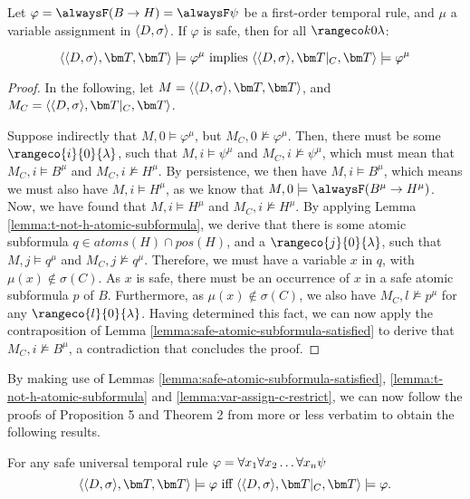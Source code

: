 \begin{lemma}\label{lemma:var-assign-c-restrict}
  Let $\varphi=\alwaysF (B \rightarrow H)=\alwaysF \psi$ be a
  first-order temporal rule, and $\mu$ a variable assignment in
  $\langle D, \sigma \rangle$. If $\varphi$ is safe, then for all $\kinlambda$:

$$
\qttandt \models \varphi^\mu \text{ implies } \qttcandt \models \varphi^\mu
$$
\end{lemma}
\begin{proof}
  In the following, let $M=\qttandt$, and $M_C=\qttcandt$.

  Suppose indirectly that $M,0 \models \varphi^\mu$, but
  $M_C,0 \not \models \varphi^\mu$. Then, there must be some
  $\rangeco{i}{0}{\lambda}$, such that $M,i \models \psi^\mu$ and
  $M_C,i \not \models \psi^\mu$, which must mean that
  $M_C,i \models B^\mu$ and $M_C,i \not \models H^\mu$. By
  persistence, we then have $M,i \models B^\mu$, which means we must
  also have $M,i \models H^\mu$, as we know that
  $M,0 \models \alwaysF(B^\mu \rightarrow H^\mu)$. Now, we have found
  that $M,i \models H^\mu$ and $M_C,i \not \models H^\mu$. By applying
  Lemma \ref{lemma:t-not-h-atomic-subformula}, we derive that there is
  some atomic subformula $q \in atoms(H) \cap pos(H)$, and a
  $\rangeco{j}{0}{\lambda}$, such that $M,j \models q^\mu$ and
  $M_C,j \not \models q^\mu$. Therefore, we must have a variable $x$
  in $q$, with $\mu(x) \not \in \sigma(C)$. As $x$ is safe, there must
  be an occurrence of $x$ in a safe atomic subformula $p$ of
  $B$. Furthermore, as $\mu(x) \not \in \sigma(C)$, we also have
  $M_C,l \not \models p^\mu$ for any $\rangeco{l}{0}{\lambda}$. Having
  determined this fact, we can now apply the contraposition of Lemma
  \ref{lemma:safe-atomic-subformula-satisfied} to derive that
  $M_C,i \not \models B^\mu$, a contradiction that concludes the
  proof.
\end{proof}

By making use of Lemmas \ref{lemma:safe-atomic-subformula-satisfied},
\ref{lemma:t-not-h-atomic-subformula} and
\ref{lemma:var-assign-c-restrict}, we can now follow the proofs of
Proposition 5 and Theorem 2 from \cite{agcapevidi17a} more or less
verbatim to obtain the following results.

\begin{proposition}
  For any safe universal temporal rule $\varphi = \forall x_1 \forall x_2 \dots \forall x_n \psi$
  \begin{equation*} \qttandt \models \varphi \text{ iff } \qttcandt \models \varphi. \end{equation*}
\end{proposition}

